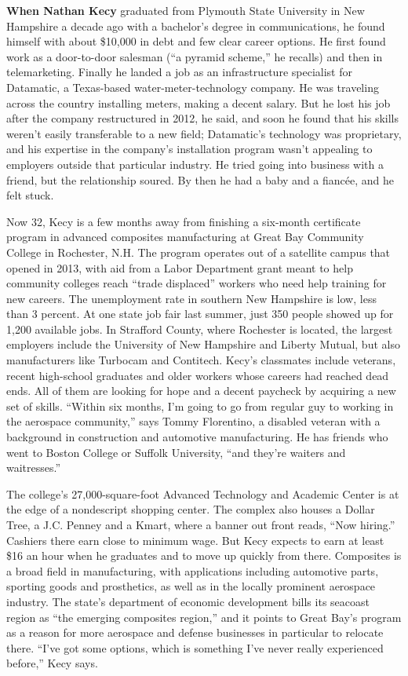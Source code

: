 \textbf{When Nathan Kecy} graduated from Plymouth State University in
New Hampshire a decade ago with a bachelor's degree in communications,
he found himself with about \$10,000 in debt and few clear career
options. He first found work as a door-to-door salesman (``a pyramid
scheme,'' he recalls) and then in telemarketing. Finally he landed a job
as an infrastructure specialist for Datamatic, a Texas-based
water-meter-technology company. He was traveling across the country
installing meters, making a decent salary. But he lost his job after the
company restructured in 2012, he said, and soon he found that his skills
weren't easily transferable to a new field; Datamatic's technology was
proprietary, and his expertise in the company's installation program
wasn't appealing to employers outside that particular industry. He tried
going into business with a friend, but the relationship soured. By then
he had a baby and a fiancée, and he felt stuck.

Now 32, Kecy is a few months away from finishing a six-month certificate
program in advanced composites manufacturing at Great Bay Community
College in Rochester, N.H. The program operates out of a satellite
campus that opened in 2013, with aid from a Labor Department grant meant
to help community colleges reach ``trade displaced'' workers who need
help training for new careers. The unemployment rate in southern New
Hampshire is low, less than 3 percent. At one state job fair last
summer, just 350 people showed up for 1,200 available jobs. In Strafford
County, where Rochester is located, the largest employers include the
University of New Hampshire and Liberty Mutual, but also manufacturers
like Turbocam and Contitech. Kecy's classmates include veterans, recent
high-school graduates and older workers whose careers had reached dead
ends. All of them are looking for hope and a decent paycheck by
acquiring a new set of skills. ``Within six months, I'm going to go from
regular guy to working in the aerospace community,'' says Tommy
Florentino, a disabled veteran with a background in construction and
automotive manufacturing. He has friends who went to Boston College or
Suffolk University, ``and they're waiters and waitresses.''

The college's 27,000-square-foot Advanced Technology and Academic Center
is at the edge of a nondescript shopping center. The complex also houses
a Dollar Tree, a J.C. Penney and a Kmart, where a banner out front
reads, ``Now hiring.'' Cashiers there earn close to minimum wage. But
Kecy expects to earn at least \$16 an hour when he graduates and to move
up quickly from there. Composites is a broad field in manufacturing,
with applications including automotive parts, sporting goods and
prosthetics, as well as in the locally prominent aerospace industry. The
state's department of economic development bills its seacoast region as
``the emerging composites region,'' and it points to Great Bay's program
as a reason for more aerospace and defense businesses in particular to
relocate there. ``I've got some options, which is something I've never
really experienced before,'' Kecy says.

